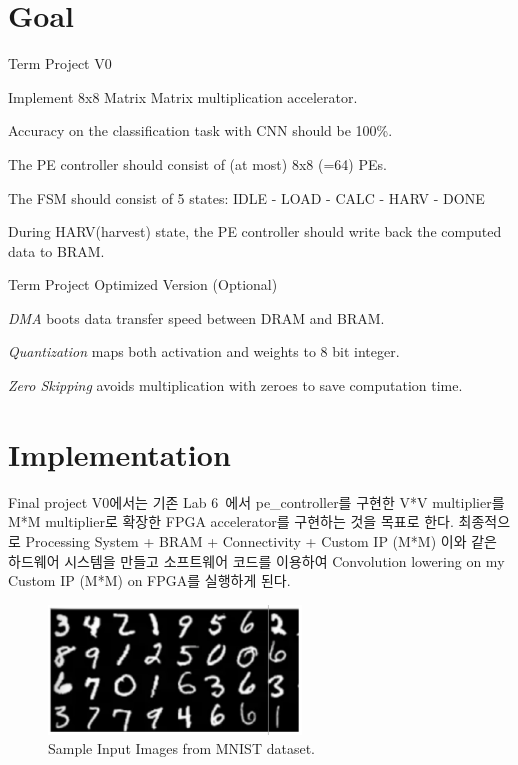 \documentclass{article}
\newcommand{\red}[1]{{\color{red} #1}}
\begin{document}
\pagestyle{fancy}

\section*{Goal}

\begin{itemize*}
\item Term Project V0
\begin{itemize*}
\item Implement 8x8 Matrix Matrix multiplication accelerator.
\begin{itemize*}
\item Accuracy on the classification task with CNN should be 100\%.
\item The PE controller should consist of (at most) 8x8 (=64) PEs.
\item The FSM should consist of 5 states: IDLE - LOAD - CALC - HARV - DONE
\item During HARV(harvest) state, the PE controller should write back the computed data to BRAM.
\end{itemize*}
\end{itemize*}
\item Term Project Optimized Version \red{(Optional)}
\begin{itemize*}
\item \textit{DMA} boots data transfer speed between DRAM and BRAM.
\item \textit{Quantization} maps both activation and weights to 8 bit integer.
\item \textit{Zero Skipping} avoids multiplication with zeroes to save computation time.
\end{itemize*}
\end{itemize*}

\section{Implementation}
Final project V0에서는 기존 Lab 6~\cite{lab6}에서 pe\_controller를 구현한 V*V multiplier를 M*M multiplier로 확장한 FPGA accelerator를 구현하는 것을 목표로 한다. 최종적으로 Processing System + BRAM + Connectivity + Custom IP (M*M) 이와 같은 하드웨어 시스템을 만들고 소프트웨어 코드를 이용하여 Convolution lowering on my Custom IP (M*M) on FPGA를 실행하게 된다. \\

\begin{figure}[ht]
	\centering
	\includegraphics[width=0.6\textwidth]{fig/mnist.png}
\caption{Sample Input Images from MNIST dataset.}
\label{fig1}
\end{figure}
\end{document}
